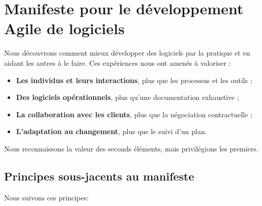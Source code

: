\label{manifeste_agile}

\section*{Manifeste pour le développement Agile de logiciels}

Nous découvrons comment mieux développer des logiciels par la pratique et en aidant les autres à le faire.
Ces expériences nous ont amenés à valoriser :

\begin{itemize}
\item \textbf{Les individus et leurs interactions}, plus que les processus et les outils ;

\item \textbf{Des logiciels opérationnels}, plus qu’une documentation exhaustive ;

\item \textbf{La collaboration avec les clients}, plus que la négociation contractuelle ;

\item \textbf{L’adaptation au changement}, plus que le suivi d’un plan.

\end{itemize}

Nous reconnaissons la valeur des seconds éléments, mais privilégions les premiers.

\subsection*{Principes sous-jacents au manifeste}

Nous suivons ces principes:

